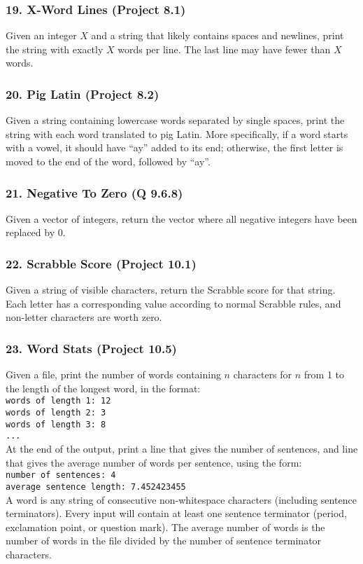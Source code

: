\documentclass{sig-alternate}
\begin{document}
\subsubsection*{19. X-Word Lines (Project 8.1)}
Given an integer $X$  and a string that likely contains spaces and newlines, print the string with exactly $X$ words per line. The last line may have fewer than $X$ words.

\subsubsection*{20. Pig Latin (Project 8.2)}
Given a string containing lowercase words separated by single spaces, print the string with each word translated to pig Latin. More specifically, if a word starts with a vowel, it should have ``ay'' added to its end; otherwise, the first letter is moved to the end of the word, followed by ``ay''.

\subsubsection*{21. Negative To Zero (Q 9.6.8)}
Given a vector of integers, return the vector where all negative integers have been replaced by 0.

\subsubsection*{22. Scrabble Score (Project 10.1)}
Given a string of visible characters, return the Scrabble score for that string. Each letter has a corresponding value according to normal Scrabble rules, and non-letter characters are worth zero.

\subsubsection*{23. Word Stats (Project 10.5)}
Given a file, print the number of words containing $n$ characters for $n$ from 1 to the length of the longest word, in the format:
\texttt{ \\
words of length 1: 12 \\
words of length 2: 3 \\
words of length 3: 8 \\
... \\
} %
At the end of the output, print a line that gives the number of sentences, and line that gives the average number of words per sentence, using the form:
\texttt{ \\
number of sentences: 4 \\
average sentence length: 7.452423455 \\
} %
A word is any string of consecutive non-whitespace characters (including sentence terminators). Every input will contain at least one sentence terminator (period, exclamation point, or question mark). The average number of words is the number of words in the file divided by the number of sentence terminator characters.
\end{document}
